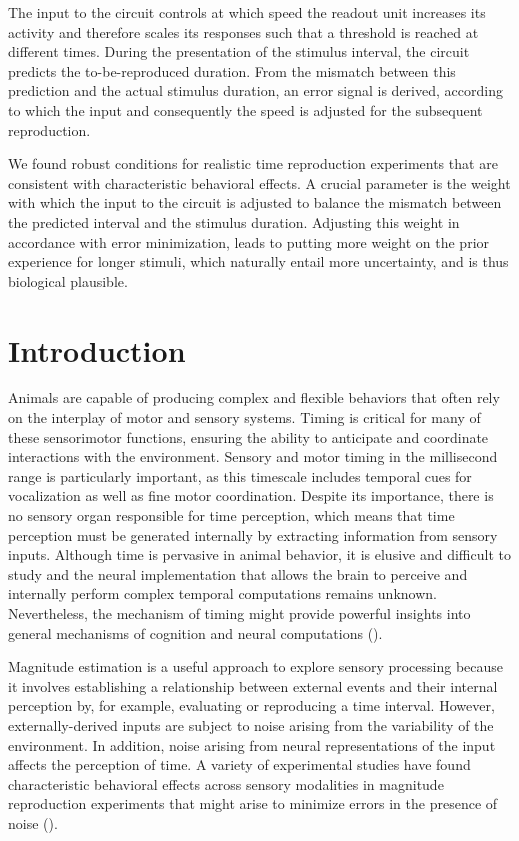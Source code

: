 \documentclass[10pt]{article}
\begin{document}
The input to the circuit controls at which speed the readout unit increases its activity and therefore scales its responses such that a threshold is reached at different times. 
During the presentation of the stimulus interval, the circuit predicts the to-be-reproduced duration. 
From the mismatch between this prediction and the actual stimulus duration, an error signal is derived, according to which the input and consequently the speed is adjusted for the subsequent reproduction.

We found robust conditions for realistic time reproduction experiments that are consistent with characteristic behavioral effects. 
A crucial parameter is the weight with which the input to the circuit is adjusted to balance the mismatch between the predicted interval and the stimulus duration. 
Adjusting this weight in accordance with error minimization, leads to putting more weight on the prior experience for longer stimuli, which naturally entail more uncertainty, and is thus biological plausible.

\pagebreak

\section{Introduction}
Animals are capable of producing complex and flexible behaviors that often rely on the interplay of motor and sensory systems.
Timing is critical for many of these sensorimotor functions, ensuring the ability to anticipate and coordinate interactions with the environment.
Sensory and motor timing in the millisecond range is particularly important, as this timescale includes temporal cues for vocalization as well as fine motor coordination.
Despite its importance, there is no sensory organ responsible for time perception, which means that time perception must be generated internally by extracting information from sensory inputs.
Although time is pervasive in animal behavior, it is elusive and difficult to study and the neural implementation that allows the brain to perceive and internally perform complex temporal computations remains unknown.
Nevertheless, the mechanism of timing might provide powerful insights into general mechanisms of cognition and neural computations (\cite{Issa2020}).

Magnitude estimation is a useful approach to explore sensory processing because it involves establishing a relationship between external events and their internal perception by, for example, evaluating or reproducing a time interval. 
However, externally-derived inputs are subject to noise arising from the variability of the environment. In addition, noise arising from neural representations of the input affects the perception of time.
A variety of experimental studies have found characteristic behavioral effects across sensory modalities in magnitude reproduction experiments that might arise to minimize errors in the presence of noise (\cite{Petzschner2015}).
\end{document}
